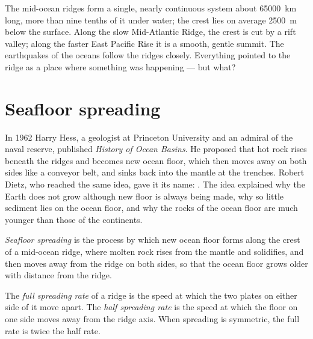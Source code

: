 The mid-ocean ridges form a single, nearly continuous system about
\qty{65000}{km} long, more than nine tenths of it under water; the crest lies
on average \qty{2500}{m} below the surface. Along the slow Mid-Atlantic Ridge,
the crest is cut by a rift valley; along the faster East Pacific Rise it is a
smooth, gentle summit. The earthquakes of the oceans follow the ridges
closely. Everything pointed to the ridge as a place
where something was happening --- but what?

\section{Seafloor spreading}

\begin{history}
In 1962 Harry Hess, a geologist at Princeton University and an admiral of the
naval reserve, published \emph{History of Ocean Basins}.
He proposed that hot rock rises beneath the ridges and becomes new ocean floor,
which then moves away on both sides like a conveyor belt, and sinks back into
the mantle at the trenches. Robert Dietz, who reached the same idea, gave it
its name: . The idea explained why the Earth does not grow
although new floor is always being made, why so little sediment lies on the
ocean floor, and why the rocks of the ocean floor are much younger than those
of the continents.
\end{history}

\begin{definition}\label{def:g11:drift-to-spreading:spreading}
\emph{Seafloor spreading} is the process by which
new ocean floor forms along the crest of a mid-ocean ridge, where molten rock
rises from the mantle and solidifies, and then moves away from the ridge on
both sides, so that the ocean floor grows older with distance from the ridge.
\end{definition}

\begin{definition}\label{def:g11:drift-to-spreading:spreading-rate}
The \emph{full spreading rate} of a ridge is the speed at
which the two plates on either side of it move apart. The \emph{half spreading
rate} is the speed at which the floor on one side moves away from the ridge
axis. When spreading is symmetric, the full rate is twice the half rate.
\end{definition}

